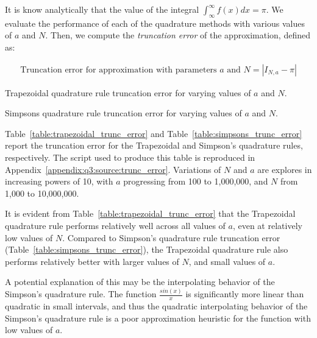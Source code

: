 \documentclass[10pt]{article}
\begin{document}
    It is know analytically that the value of the integral $\int_\infty^\infty f(x) dx = \pi$. We evaluate the performance of each of the quadrature methods with various values of $a$ and $N$. Then, we compute the \textit{truncation error} of the approximation, defined as:

    \begin{gather*}
        \text{Truncation error for approximation with parameters $a$ and $N$} = \left| I_{N,a} - \pi \right|
    \end{gather*}

    \begin{table}[h]
        \centering
        \caption{Trapezoidal quadrature rule truncation error for varying values of $a$ and $N$.}
        \label{table:trapezoidal_trunc_error}
    \end{table}

    \begin{table}[h]
        \centering
        \caption{Simpsons quadrature rule truncation error for varying values of $a$ and $N$.}
        \label{table:simpsons_trunc_error}
    \end{table}

    Table~\ref{table:trapezoidal_trunc_error} and Table~\ref{table:simpsons_trunc_error} report the truncation error for the Trapezoidal and Simpson's quadrature rules, respectively. The script used to produce this table is reproduced in Appendix~\ref{appendix:q3:source:trunc_error}. Variations of $N$ and $a$ are explores in increasing powers of 10, with $a$ progressing from 100 to 1,000,000, and $N$ from 1,000 to 10,000,000.

    It is evident from Table~\ref{table:trapezoidal_trunc_error} that the Trapezoidal quadrature rule performs relatively well across all values of $a$, even at relatively low values of $N$. Compared to Simpson's quadrature rule truncation error (Table~\ref{table:simpsons_trunc_error}), the Trapezoidal quadrature rule also performs relatively better with larger values of $N$, and small values of $a$.
    
    A potential explanation of this may be the interpolating behavior of the Simpson's quadrature rule. The function $\frac{sin{(x)}}{x}$ is significantly more linear than quadratic in small intervals, and thus the quadratic interpolating behavior of the Simpson's quadrature rule is a poor approximation heuristic for the function with low values of $a$.
\end{document}
